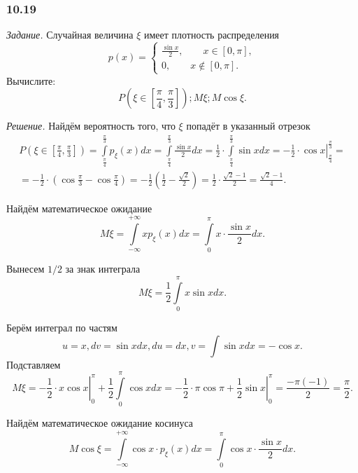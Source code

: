 \subsubsection*{10.19}

\textit{Задание.} Случайная величина $ \xi $ имеет плотность распределения
$$p \left( x \right) =
\begin{cases}
\frac{ \sin x}{2}, \qquad x \in \left[ 0, \pi \right], \\
0, \qquad x \notin \left[ 0, \pi \right].
\end{cases}$$
Вычислите:
$$P \left( \xi \in \left[ \frac{ \pi }{4}, \frac{ \pi }{3} \right] \right);
M \xi;
M \cos \xi.$$

\textit{Решение.} Найдём вероятность того, что $ \xi $ попадёт в указанный отрезок
\begin{equation*}
\begin{split}
P \left( \xi \in \left[ \frac{ \pi }{4}, \frac{ \pi }{3} \right] \right) =
\int \limits_{ \frac{ \pi }{4}}^{ \frac{ \pi }{3}} p_{ \xi } \left( x \right) dx =
\int \limits_{ \frac{ \pi }{4}}^{ \frac{ \pi }{3}} \frac{ \sin x}{2} dx =
\frac{1}{2} \cdot \int \limits_{ \frac{ \pi }{4}}^{ \frac{ \pi }{3}} \sin x dx =
\left. - \frac{1}{2} \cdot \cos x \right|_{ \frac{ \pi }{4}}^{ \frac{ \pi }{3}} = \\
= - \frac{1}{2} \cdot \left( \cos \frac{ \pi }{3} - \cos \frac{ \pi }{4} \right) =
- \frac{1}{2} \left( \frac{1}{2} - \frac{ \sqrt{2}}{2} \right) =
\frac{1}{2} \cdot \frac{ \sqrt{2} - 1}{2} =
\frac{ \sqrt{2} - 1}{4}.
\end{split}
\end{equation*}

Найдём математическое ожидание
$$M \xi =
\int \limits_{- \infty }^{+ \infty } xp_{ \xi } \left( x \right) dx =
\int \limits_0^{ \pi } x \cdot \frac{ \sin x}{2} dx.$$

Вынесем $1/2$ за знак интеграла
$$M \xi =
\frac{1}{2} \int \limits_0^{ \pi } x \sin x dx.$$

Берём интеграл по частям
$$u = x,
dv = \sin x dx,
du = dx,
v = \int \sin x dx = - \cos x.$$
Подставляем
$$M \xi =
\left. - \frac{1}{2} \cdot x \cos x \right|_0^{ \pi } + \frac{1}{2} \int \limits_0^{ \pi } \cos x dx =
\left. - \frac{1}{2} \cdot \pi \cos \pi + \frac{1}{2} \sin x \right|_0^{ \pi } =
\frac{- \pi \left( -1 \right) }{2} =
\frac{ \pi }{2}.$$

Найдём математическое ожидание косинуса
$$M \cos \xi =
\int \limits_{- \infty }^{+ \infty } \cos x \cdot p_{ \xi } \left( x \right) dx =
\int \limits_0^{ \pi } \cos x \cdot \frac{ \sin x}{2} dx.$$

